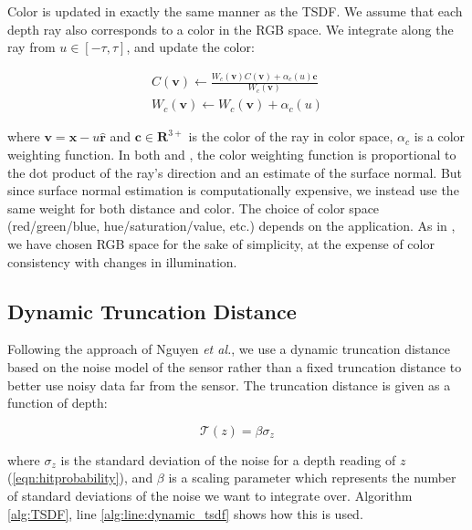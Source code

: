 \documentclass[conference]{IEEEtran}
\newcommand{\eref}[1]{(\ref{#1})}
\newcommand{\etal}{\textit{et al.}}
\begin{document}
Color is updated in exactly the same manner as the TSDF. We assume that each
depth ray also corresponds to a color in the RGB space. We integrate along the
ray from $u \in [-\tau, \tau]$, and update the color:

\begin{align}
C(\mathbf{v}) \gets \frac{W_c(\mathbf{v}) C(\mathbf{v}) +
\alpha_c(u) \mathbf{c}}{W_c(\mathbf{v})}
\\
%
W_c(\mathbf{v}) \gets W_c(\mathbf{v}) + \alpha_c(u)
\end{align}

\noindent where $\mathbf{v} = \mathbf{x} - u\mathbf{\hat{r}}$ and $\mathbf{c}
\in \mathbf{R}^{3+}$ is the color of the ray in color space, $\alpha_c$ is a
color weighting function. In both \cite{Bylow2013} and \cite{Whelan2013}, the color weighting function is proportional to the dot
product of the ray's direction and an estimate of the surface normal. But since
surface normal estimation is computationally expensive, we instead use the same
weight for both distance and color. The choice of color space (red/green/blue,
hue/saturation/value, etc.) depends on the application. As in \cite{Bylow2013}, we have chosen RGB space for the sake
of simplicity, at the expense of color consistency with changes in illumination.


\subsection{Dynamic Truncation Distance}
\label{section:dynamic_trunc}
Following the approach of Nguyen \etal\cite{Nguyen2012}, we use a dynamic
truncation distance based on the noise model of the sensor rather than a fixed
truncation distance to better use noisy data far from the sensor. The truncation
distance is given as a function of depth:

\begin{equation} \mathcal{T} (z) = \beta\sigma_{z} \end{equation}

\noindent where $\sigma_{z}$ is the standard deviation of the noise for a depth
reading of $z$ \eref{eqn:hitprobability}, and $\beta$ is a scaling
parameter which represents the number of standard deviations of the noise we
want to integrate over. Algorithm \ref{alg:TSDF}, line
\ref{alg:line:dynamic_tsdf} shows how this is used.
% 
\end{document}
